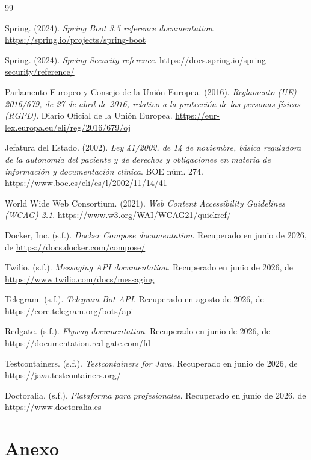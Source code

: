 \documentclass[12pt,a4paper]{report}
\begin{document}
\begin{thebibliography}{99}

Spring. (2024). \textit{Spring Boot 3.5 reference documentation}. \url{https://spring.io/projects/spring-boot}

Spring. (2024). \textit{Spring Security reference}. \url{https://docs.spring.io/spring-security/reference/}

Parlamento Europeo y Consejo de la Unión Europea. (2016). \textit{Reglamento (UE) 2016/679, de 27 de abril de 2016, relativo a la protección de las personas físicas (RGPD)}. Diario Oficial de la Unión Europea. \url{https://eur-lex.europa.eu/eli/reg/2016/679/oj}

Jefatura del Estado. (2002). \textit{Ley 41/2002, de 14 de noviembre, básica reguladora de la autonomía del paciente y de derechos y obligaciones en materia de información y documentación clínica}. BOE núm. 274. \url{https://www.boe.es/eli/es/l/2002/11/14/41}

World Wide Web Consortium. (2021). \textit{Web Content Accessibility Guidelines (WCAG) 2.1}. \url{https://www.w3.org/WAI/WCAG21/quickref/}

Docker, Inc. (s.f.). \textit{Docker Compose documentation}. Recuperado en junio de 2026, de \url{https://docs.docker.com/compose/}

Twilio. (s.f.). \textit{Messaging API documentation}. Recuperado en junio de 2026, de \url{https://www.twilio.com/docs/messaging}

Telegram. (s.f.). \textit{Telegram Bot API}. Recuperado en agosto de 2026, de \url{https://core.telegram.org/bots/api}

Redgate. (s.f.). \textit{Flyway documentation}. Recuperado en junio de 2026, de \url{https://documentation.red-gate.com/fd}

Testcontainers. (s.f.). \textit{Testcontainers for Java}. Recuperado en junio de 2026, de \url{https://java.testcontainers.org/}

Doctoralia. (s.f.). \textit{Plataforma para profesionales}. Recuperado en junio de 2026, de \url{https://www.doctoralia.es}

\end{thebibliography}

\chapter*{Anexo}
\end{document}
